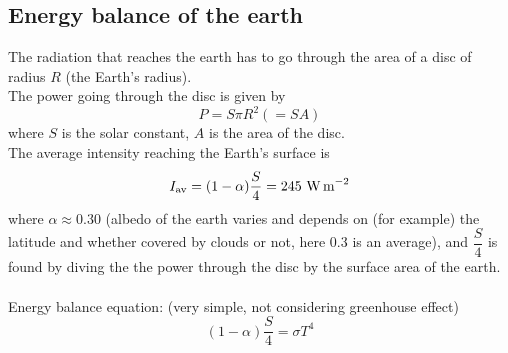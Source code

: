 \documentclass[a4paper,12pt]{article}
\begin{document}
\subsection{Energy balance of the earth}
\begin{center}
\end{center}
The radiation that reaches the earth has to go through the area of a disc of radius $R$ (the Earth's radius).\\
The power going through the disc is given by
\[P=S\pi R^2(=SA)\]
where $S$ is the solar constant, $A$ is the area of the disc.\\
The average intensity reaching the Earth's surface is 
\[I_\text{av}=(1-\alpha)\dfrac{S}{4}=245\ \text{W\,m}^{-2}\]
where $\alpha\approx 0.30$ (albedo of the earth varies and depends on (for example) the latitude and whether covered by clouds or not, here 0.3 is an average), and $\dfrac{S}{4}$ is found by diving the the power through the disc by the surface area of the earth.
\\\\Energy balance equation: (very simple, not considering greenhouse effect)
\[(1-\alpha)\dfrac{S}{4}=\sigma T^4\]
\end{document}
